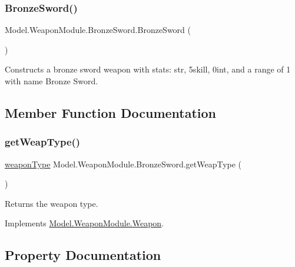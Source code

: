\subsubsection{\texorpdfstring{Bronze\+Sword()}{BronzeSword()}}
{\footnotesize\ttfamily Model.\+Weapon\+Module.\+Bronze\+Sword.\+Bronze\+Sword (\begin{DoxyParamCaption}{ }\end{DoxyParamCaption})\hspace{0.3cm}{\ttfamily [inline]}}

Constructs a bronze sword weapon with stats\+: str, 5skill, 0int, and a range of 1 with name Bronze Sword. 

\subsection{Member Function Documentation}
\hypertarget{class_model_1_1_weapon_module_1_1_bronze_sword_a3b8efec8bd8cfe293f0bf96dc024a46a}{}\label{class_model_1_1_weapon_module_1_1_bronze_sword_a3b8efec8bd8cfe293f0bf96dc024a46a} 
\subsubsection{\texorpdfstring{get\+Weap\+Type()}{getWeapType()}}
{\footnotesize\ttfamily \hyperlink{namespace_model_1_1_weapon_module_a3390c266f89e3399c2bc7fa31f13cbec}{weapon\+Type} Model.\+Weapon\+Module.\+Bronze\+Sword.\+get\+Weap\+Type (\begin{DoxyParamCaption}{ }\end{DoxyParamCaption})\hspace{0.3cm}{\ttfamily [inline]}}

Returns the weapon type. 

Implements \hyperlink{interface_model_1_1_weapon_module_1_1_weapon_a175133855ef446d3d87c70d13979be9c}{Model.\+Weapon\+Module.\+Weapon}.



\subsection{Property Documentation}
\hypertarget{class_model_1_1_weapon_module_1_1_bronze_sword_ab87b55d8ac8623f036c66750992731b6}{}\label{class_model_1_1_weapon_module_1_1_bronze_sword_ab87b55d8ac8623f036c66750992731b6} 
